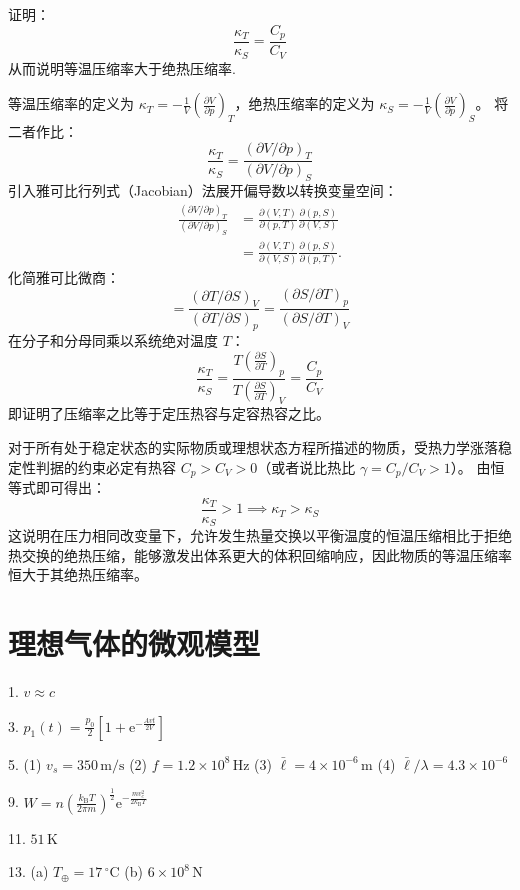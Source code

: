 \begin{exercise}\label{ex:12.14}
证明：
$$ \frac{\kappa_T}{\kappa_S} = \frac{C_p}{C_V} $$
从而说明等温压缩率大于绝热压缩率.
\end{exercise}
\begin{solution}
等温压缩率的定义为 $\kappa_T = -\frac{1}{V} \left(\frac{\partial V}{\partial p}\right)_T$，绝热压缩率的定义为 $\kappa_S = -\frac{1}{V} \left(\frac{\partial V}{\partial p}\right)_S$。
将二者作比：
$$ \frac{\kappa_T}{\kappa_S} = \frac{(\partial V/\partial p)_T}{(\partial V/\partial p)_S} $$
引入雅可比行列式（Jacobian）法展开偏导数以转换变量空间：
\[
\begin{aligned}
\frac{(\partial V/\partial p)_T}{(\partial V/\partial p)_S}
 &=\frac{\partial(V,T)}{\partial(p,T)}
   \frac{\partial(p,S)}{\partial(V,S)}\\
 &=\frac{\partial(V,T)}{\partial(V,S)}
   \frac{\partial(p,S)}{\partial(p,T)}.
\end{aligned}
\]
化简雅可比微商：
$$ = \frac{(\partial T/\partial S)_V}{(\partial T/\partial S)_p} = \frac{(\partial S/\partial T)_p}{(\partial S/\partial T)_V} $$
在分子和分母同乘以系统绝对温度 $T$：
$$ \frac{\kappa_T}{\kappa_S} = \frac{T \left(\frac{\partial S}{\partial T}\right)_p}{T \left(\frac{\partial S}{\partial T}\right)_V} = \frac{C_p}{C_V} $$
即证明了压缩率之比等于定压热容与定容热容之比。

对于所有处于稳定状态的实际物质或理想状态方程所描述的物质，受热力学涨落稳定性判据的约束必定有热容 $C_p > C_V > 0$（或者说比热比 $\gamma = C_p/C_V > 1$）。
由恒等式即可得出：
$$ \frac{\kappa_T}{\kappa_S} > 1 \implies \kappa_T > \kappa_S $$
这说明在压力相同改变量下，允许发生热量交换以平衡温度的恒温压缩相比于拒绝热交换的绝热压缩，能够激发出体系更大的体积回缩响应，因此物质的等温压缩率恒大于其绝热压缩率。
\end{solution}



\chapter{理想气体的微观模型}

\begin{oddanswers}
1. $v \approx c$

3. $p_1(t) = \frac{p_0}{2} \left[ 1 + \text{e}^{-\frac{Avt}{2V}} \right]$

5. (1) $v_s = 350\,\mathrm{m/s}$
(2) $f = 1.2 \times 10^8\,\mathrm{Hz}$
(3) $\bar{\ell} = 4 \times 10^{-6}\,\mathrm{m}$
(4) $\bar{\ell}/\lambda = 4.3 \times 10^{-6}$

9. $W = n \left( \frac{k_{\mathrm{B}} T}{2\pi m} \right)^{\frac{1}{2}} \text{e}^{-\frac{mv_e^2}{2k_{\mathrm{B}} T}}$

11. $51\,\mathrm{K}$

13. (a) $T_{\oplus} = 17\,^{\circ}\mathrm{C}$
(b) $6 \times 10^8\,\mathrm{N}$
\end{oddanswers}

